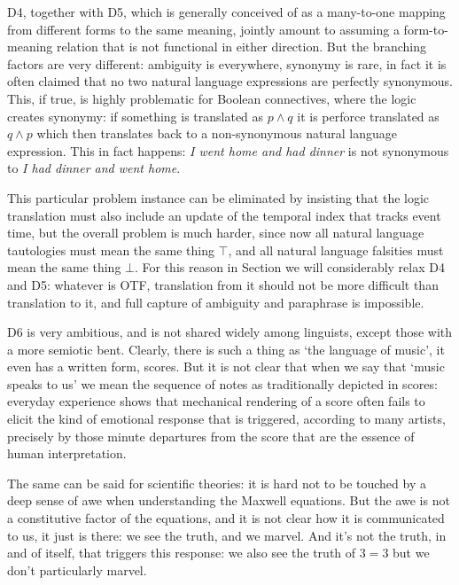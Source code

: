 \documentclass[output=paper,colorlinks=true,citecolor=brown]{langscibook}
\begin{document}
D4, together with D5, which is generally conceived of as a many-to-one mapping
from different forms to the same meaning, jointly amount to assuming a
form-to-meaning relation that is not functional in either direction. But the
branching factors are very different: ambiguity is everywhere, synonymy is
rare, in fact it is often claimed that no two natural language expressions are
perfectly synonymous. This, if true, is highly problematic for Boolean
connectives, where the logic creates synonymy: if something is translated as
$p \wedge q$ it is perforce translated as $q \wedge p$ which then translates
back to a non-synonymous natural language expression. This in fact happens:
\emph{I went home and had dinner} is not synonymous to \emph{I had dinner and
  went home}.

This particular problem instance can be eliminated by insisting that the logic
translation must also include an update of the temporal index that tracks event
time, but the overall problem is much harder, since now all natural language
tautologies must mean the same thing $\top$, and all natural language
falsities must mean the same thing $\bot$. For this reason in
Section  we will considerably relax D4 and D5: whatever is OTF,
translation from it should not be more difficult than translation to it, and
full capture of ambiguity and paraphrase is impossible. 

\medskip\noindent D6 is very ambitious, and is not shared widely among
linguists, except those with a more semiotic bent. Clearly, there is such a
thing as `the language of music', it even has a written form, scores. But it
is not clear that when we say that `music speaks to us' we mean the sequence
of notes as traditionally depicted in scores: everyday experience shows that
mechanical rendering of a score often fails to elicit the kind of emotional
response that is triggered, according to many artists, precisely by those minute
departures from the score that are the essence of human interpretation.

The same can be said for scientific theories: it is hard not to be touched by
a deep sense of awe when understanding the Maxwell equations. But the awe is
not a constitutive factor of the equations, and it is not clear how it is
communicated to us, it just is there: we see the truth, and we marvel. And
it's not the truth, in and of itself, that triggers this response: we also see
the truth of $3=3$ but we don't particularly marvel.
\end{document}
